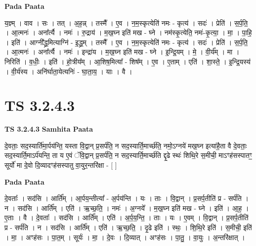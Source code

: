\documentclass[17pt]{extarticle}
\begin{document}
\textbf{Pada Paata} \newline

य॒ज्ञ्म् । वाव । सः । तत् । अ॒ह॒न्न् । तस्मै᳚ । ए॒व । न॒म॒स्कृत्येति॑ नमः - कृत्य॑ । सदः॑ । प्रेति॑ । स॒र्प॒ति॒ । आ॒त्मनः॑ । अना᳚र्त्यै । नमः॑ । रु॒द्राय॑ । म॒ख॒घ्न इति॑ मख - घ्ने । नम॑स्कृ॒त्येति॒ नमः॑-कृ॒त्या॒ । मा॒ । पा॒हि॒ । इति॑ । आग्नी᳚द्ध्र॒मित्याग्नि॑ - इ॒द्ध्र॒म् । तस्मै᳚ । ए॒व । न॒म॒स्कृत्येति॑ नमः - कृत्य॑ । सदः॑ । प्रेति॑ । स॒र्प॒ति॒ । आ॒त्मनः॑ । अना᳚र्त्यै । नमः॑ । इन्द्रा॑य । म॒ख॒घ्न इति॑ मख - घ्ने । इ॒न्द्रि॒यम् । मे॒ । वी॒र्य᳚म् । मा । निरिति॑ । व॒धीः॒ । इति॑ । हो॒त्रीय᳚म् । आ॒शिष॒मित्या᳚ - शिष᳚म् । ए॒व । ए॒ताम् । एति॑ । शा॒स्ते॒ । इ॒न्द्रि॒यस्य॑ । वी॒र्य॑स्य । अनि॑र्घाता॒येत्यनिः॑ - घा॒ता॒य॒ । याः । वै ।  \newline





\section{ TS 3.2.4.3 }

\textbf{TS 3.2.4.3 } \newline
\textbf{Samhita Paata} \newline

दे॒वताः॒ सद॒स्यार्ति॑मा॒र्पय॑न्ति॒ यस्ता वि॒द्वान् प्र॒सर्प॑ति॒ न सद॒स्यार्ति॒मार्च्छ॑ति॒ नमो॒ऽग्नये॑ मख॒घ्न इत्या॑है॒ता वै दे॒वताः॒ सद॒स्यार्ति॒माऽर्प॑यन्ति॒ ता य ए॒वं ॅवि॒द्वान् प्र॒सर्प॑ति॒ न सद॒स्यार्ति॒मार्च्छ॑ति द्दृ॒ढे स्थः॑ शिथि॒रे स॒मीची॒ माऽꣳह॑सस्पातꣳ॒॒ सूर्यो॑ मा दे॒वो दि॒व्यादꣳह॑सस्पातु वा॒युर॒न्तरि॑क्षा - [  ] \newline

\textbf{Pada Paata} \newline

दे॒वताः᳚ । सद॑सि । आर्ति᳚म् । आ॒र्पय॒न्तीत्या᳚ - अ॒र्पय॑न्ति । यः । ताः । वि॒द्वान् । प्र॒सर्प॒तीति॑ प्र - सर्प॑ति । न । सद॑सि । आर्ति᳚म् । एति॑ । ऋ॒च्छ॒ति॒ । नमः॑ । अ॒ग्नये᳚ । म॒ख॒घ्न इति॑ मख - घ्ने । इति॑ । आ॒ह॒ । ए॒ताः । वै । दे॒वताः᳚ । सद॑सि । आर्ति᳚म् । एति॑ । अ॒र्प॒य॒न्ति॒ । ताः । यः । ए॒वम् । वि॒द्वान् । प्र॒सर्प॒तीति॑ प्र - सर्प॑ति । न । सद॑सि । आर्ति᳚म् । एति॑ । ऋ॒च्छ॒ति॒ । दृ॒ढे इति॑ । स्थः॒ । शि॒थि॒रे इति॑ । स॒मीची॒ इति॑ । मा॒ । अꣳह॑सः । पा॒त॒म् । सूर्यः॑ । मा॒ । दे॒वः । दि॒व्यात् । अꣳह॑सः । पा॒तु॒ । वा॒युः । अ॒न्तरि॑क्षात् ।  \newline




\end{document}
